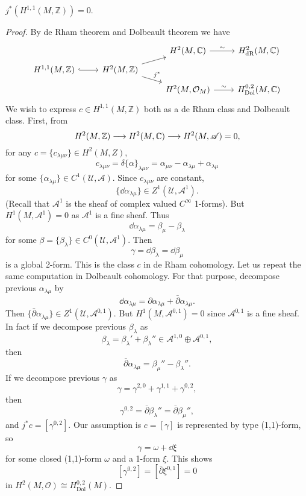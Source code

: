 \documentclass[12pt]{article}
\begin{document}
\begin{lemma}
  \(j^*(H^{1,1}(M,\mathbb{Z}))=0\).
\end{lemma}
\begin{proof}
  By de Rham theorem and Dolbeault theorem we have
  \[\begin{tikzcd}[row sep=tiny]
    && {H^{2}(M,\mathbb{C})} & {H_{\mathrm{dR}}^{2}(M,\mathbb{C})} \\
    {H^{1,1}(M,\mathbb{Z})} & {H^{2}(M,\mathbb{Z})} \\
    && {H^{2}(M,\mathcal{O}_M)} & {H_{\mathrm{Dol}}^{0,2}(M,\mathbb{C})}
    \arrow[hook, from=2-1, to=2-2]
    \arrow["{j^*}", from=2-2, to=3-3]
    \arrow["\sim", from=3-3, to=3-4]
    \arrow["\sim", from=1-3, to=1-4]
    \arrow[from=2-2, to=1-3]
  \end{tikzcd}\]
  We wish to express \(c\in H^{1,1}(M,\mathbb{Z})\) both as a de Rham class and
  Dolbeault class. First, from \[
    H^2(M,\mathbb{Z})\longrightarrow H^2(M,\mathbb{C})\longrightarrow H^2(M,\mathscr{A})=0
  ,\] for any \(c=\{c_{\lambda\mu\nu}\}\in H^2(M,Z)\), \[
    c_{\lambda\mu\nu}=\delta\{\alpha\}_{\lambda\mu\nu}=\alpha_{\mu\nu}
    -\alpha_{\lambda\mu}+\alpha_{\lambda\mu}
  \] for some \(\{\alpha_{\lambda\mu}\}\in C^1(\mathcal{U},\mathscr{A})\). Since 
  \(c_{\lambda\mu\nu}\) are constant, \[
    \{\dd{\alpha_{\lambda\mu}}\}\in Z^1(\mathcal{U},\mathcal{A}^1)
  .\] (Recall that \(\mathcal{A}^1\) is the sheaf of complex valued \(C^\infty\)
  1-forms). But \(H^1(M,\mathcal{A}^1)=0\) as \(\mathcal{A}^1\) is a fine sheaf.
  Thus \[
    \dd{\alpha_{\lambda\mu}}=\beta_\mu-\beta_\lambda
  \] for some \(\beta=\{\beta_\lambda\}\in C^0(\mathcal{U},\mathcal{A}^1)\). Then \[
    \gamma=\dd{\beta_\lambda}=\dd{\beta_\mu}
  \] is a global 2-form. This is the class \(c\) in de Rham cohomology. Let us repeat
  the same computation in Dolbeault cohomology. For that purpose, decompose previous
  \(\alpha_{\lambda\mu}\) by \[
    \dd{\alpha_{\lambda\mu}}=\partial\alpha_{\lambda\mu}
    +\bar{\partial}\alpha_{\lambda\mu}
  .\] Then \(\{\bar{\partial}\alpha_{\lambda\mu}\}\in Z^1(\mathcal{U},\mathcal{A}^{0,1}
  )\). But \(H^1(M,\mathcal{A}^{0,1})=0\) since \(\mathcal{A}^{0,1}\) is a fine sheaf.
  In fact if we decompose previous \(\beta_\lambda\) as \[
    \beta_\lambda=\beta_\lambda'+\beta_\lambda''\in \mathcal{A}^{1,0}
    \oplus \mathcal{A}^{0,1}
  ,\] then \[
    \bar{\partial}\alpha_{\lambda\mu}=\beta_\mu''-\beta_\lambda''
  .\] If we decompose previous \(\gamma\) as \[
    \gamma=\gamma^{2,0}+\gamma^{1,1}+\gamma^{0,2}
  ,\] then \[
    \gamma^{0,2}=\bar{\partial}\beta_\lambda''=\bar{\partial}\beta_\mu''
  ,\] and \(j^*c=[\gamma^{0,2}]\). Our assumption is \(c=[\gamma]\) is represented by
  type (1,1)-form, so \[
    \gamma=\omega+\dd{\xi}
  \] for some closed (1,1)-form \(\omega\) and a 1-form \(\xi\). This shows \[
    [\gamma^{0,2}]=[\bar{\partial}\xi^{0,1}]=0
  \] in \(H^2(M,\mathcal{O})\cong H^{0,2}_{\mathrm{Dol}}(M)\).
\end{proof}
\end{document}
